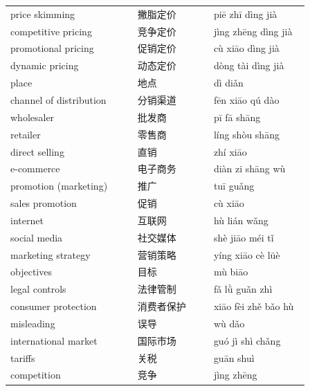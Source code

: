 \documentclass[11pt]{article}
\begin{document}
\begin{longtable}{@{}p{0.40\linewidth}p{0.24\linewidth}p{0.30\linewidth}@{}}
price skimming & 撇脂定价 & piē zhī dìng jià \\
competitive pricing & 竞争定价 & jìng zhēng dìng jià \\
promotional pricing & 促销定价 & cù xiāo dìng jià \\
dynamic pricing & 动态定价 & dòng tài dìng jià \\
place & 地点 & dì diǎn \\
channel of distribution & 分销渠道 & fēn xiāo qú dào \\
wholesaler & 批发商 & pī fā shāng \\
retailer & 零售商 & líng shòu shāng \\
direct selling & 直销 & zhí xiāo \\
e-commerce & 电子商务 & diàn zi shāng wù \\
promotion (marketing) & 推广 & tuī guǎng \\
sales promotion & 促销 & cù xiāo \\
internet & 互联网 & hù lián wǎng \\
social media & 社交媒体 & shè jiāo méi tǐ \\
marketing strategy & 营销策略 & yíng xiāo cè lüè \\
objectives & 目标 & mù biāo \\
legal controls & 法律管制 & fǎ lǜ guǎn zhì \\
consumer protection & 消费者保护 & xiāo fèi zhě bǎo hù \\
misleading & 误导 & wù dǎo \\
international market & 国际市场 & guó jì shì chǎng \\
tariffs & 关税 & guān shuì \\
competition & 竞争 & jìng zhēng \\
\end{longtable}
\end{document}
